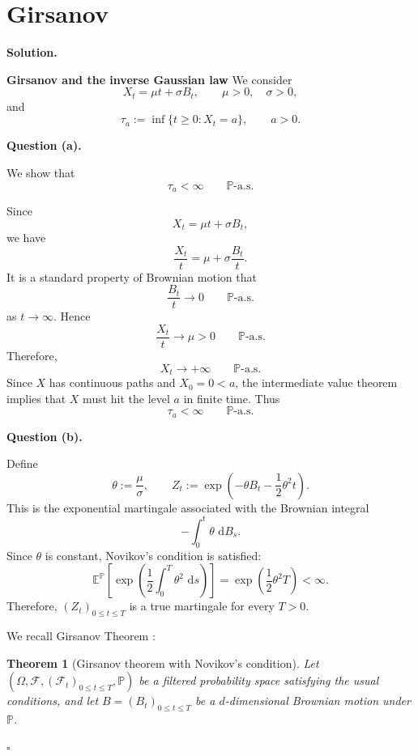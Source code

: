 \documentclass[11pt]{article}
\theoremstyle{plain}
\newtheorem{theorem}{Theorem}[section]
\newcommand{\E}{\mathbb{E}}
\newcommand{\dd}{\,\mathrm{d}}
\newcommand{\1}{\mathbf{1}}
\theoremstyle{definition}
\newenvironment{solution}
{\par\medskip\noindent\textbf{Solution.}\par\medskip}
{\hfill$\square$\par\medskip}
\newenvironment{solutionpart}[1]
{\par\medskip\noindent\textbf{#1.}\par\smallskip}
{\par\medskip}
\begin{document}
\section{Girsanov}


\begin{solution}\textbf{Girsanov and the inverse Gaussian law}
We consider
\[
X_t=\mu t+\sigma B_t,
\qquad
\mu>0,\quad \sigma>0,
\]
and
\[
\tau_a:=\inf\{t\ge 0:X_t=a\},
\qquad a>0.
\]

\begin{solutionpart}{Question (a)}
We show that
\[
\tau_a<\infty
\qquad \mathbb{P}\text{-a.s.}
\]

Since
\[
X_t=\mu t+\sigma B_t,
\]
we have
\[
\frac{X_t}{t}
=
\mu+\sigma\frac{B_t}{t}.
\]
It is a standard property of Brownian motion that
\[
\frac{B_t}{t}\longrightarrow 0
\qquad \mathbb{P}\text{-a.s.}
\]
as $t\to\infty$. Hence
\[
\frac{X_t}{t}\longrightarrow \mu>0
\qquad \mathbb{P}\text{-a.s.}
\]
Therefore,
\[
X_t\longrightarrow +\infty
\qquad \mathbb{P}\text{-a.s.}
\]
Since $X$ has continuous paths and $X_0=0<a$, the intermediate value theorem implies that $X$ must hit the level $a$ in finite time. Thus
\[
\tau_a<\infty
\qquad \mathbb{P}\text{-a.s.}
\]
\end{solutionpart}

\begin{solutionpart}{Question (b)}
Define
\[
\theta:=\frac{\mu}{\sigma},
\qquad
Z_t:=\exp\left(-\theta B_t-\frac12\theta^2t\right).
\]
This is the exponential martingale associated with the Brownian integral
\[
-\int_0^t \theta\,\dd B_s.
\]
Since $\theta$ is constant, Novikov's condition is satisfied:
\[
\E^\mathbb{P}\left[
\exp\left(\frac12\int_0^T \theta^2\,\dd s\right)
\right]
=
\exp\left(\frac12\theta^2T\right)
<\infty.
\]
Therefore, $(Z_t)_{0\le t\le T}$ is a true martingale for every $T>0$.

We recall Girsanov Theorem : 

\begin{theorem}[Girsanov theorem with Novikov's condition]
Let $(\Omega,\mathcal F,(\mathcal F_t)_{0\le t\le T},\mathbb P)$ be a filtered probability space satisfying the usual conditions, and let
$B=(B_t)_{0\le t\le T}$ be a $d$-dimensional Brownian motion under $\mathbb P$.


\end{theorem}
\end{solutionpart}
\end{solution}
\end{document}
